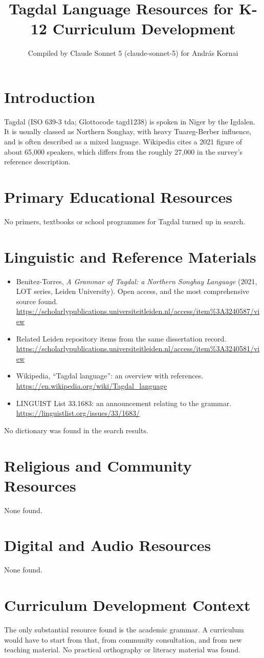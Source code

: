 \documentclass[12pt]{article}
\title{Tagdal Language Resources for K-12 Curriculum Development}
\author{Compiled by Claude Sonnet 5 (claude-sonnet-5) for Andr\'as Kornai}
\date{}
\begin{document}
\maketitle

\section{Introduction}
Tagdal (ISO 639-3 tda; Glottocode tagd1238) is spoken in Niger by the Igdalen. It is usually classed as Northern Songhay, with heavy Tuareg-Berber influence, and is often described as a mixed language. Wikipedia cites a 2021 figure of about 65,000 speakers, which differs from the roughly 27,000 in the survey's reference description.

\section{Primary Educational Resources}
No primers, textbooks or school programmes for Tagdal turned up in search.

\section{Linguistic and Reference Materials}
\begin{itemize}
\item Benitez-Torres, \emph{A Grammar of Tagdal: a Northern Songhay Language} (2021, LOT series, Leiden University). Open access, and the most comprehensive source found. \url{https://scholarlypublications.universiteitleiden.nl/access/item%3A3240587/view}
\item Related Leiden repository items from the same dissertation record. \url{https://scholarlypublications.universiteitleiden.nl/access/item%3A3240581/view}
\item Wikipedia, ``Tagdal language'': an overview with references. \url{https://en.wikipedia.org/wiki/Tagdal_language}
\item LINGUIST List 33.1683: an announcement relating to the grammar. \url{https://linguistlist.org/issues/33/1683/}
\end{itemize}
No dictionary was found in the search results.

\section{Religious and Community Resources}
None found.

\section{Digital and Audio Resources}
None found.

\section{Curriculum Development Context}
The only substantial resource found is the academic grammar. A curriculum would have to start from that, from community consultation, and from new teaching material. No practical orthography or literacy material was found.
\end{document}
